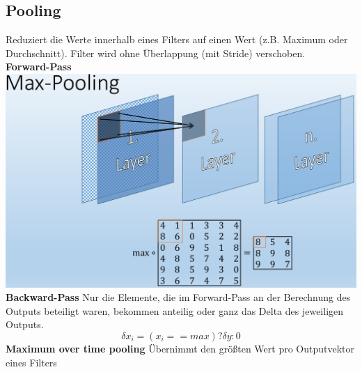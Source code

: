 \documentclass[12pt]{article}
\begin{document}
	\subsection{Pooling}
	Reduziert die Werte innerhalb eines Filters auf einen Wert (z.B. Maximum oder Durchschnitt). Filter wird ohne Überlappung (mit Stride) verschoben.\\
	\textbf{Forward-Pass}\\
	\includegraphics[width=\linewidth]{figures/max-pooling.png}\\
	\textbf{Backward-Pass} Nur die Elemente, die im Forward-Pass an der Berechnung des Outputs beteiligt waren, bekommen anteilig oder ganz das Delta des jeweiligen Outputs.
	$$\delta x_i = (x_i == max) ? \delta y : 0$$
	\textbf{Maximum over time pooling} Übernimmt den größten Wert pro Outputvektor eines Filters
\end{document}
